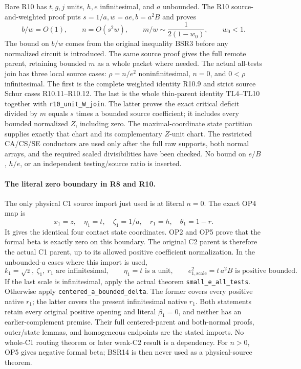 Bare R10 has \(t,g,j\) units, \(h,e\) infinitesimal,
and \(a\) unbounded.  The R10 source-and-weighted proof puts
\(s=1/a,w=ae,b=a^2B\) and proves
\[
 b/w=O(1),\qquad n=O(s^2w),\qquad
 m/w\sim\frac1{2(1-w_0)},\qquad w_0<1 .
 \tag{BSR13}
\]
The bound on \(b/w\) comes from the original inequality
BSR3 before any normalized circuit is introduced.
The same source proof gives the full remote parent,
retaining bounded \(m\) as a whole packet where needed.
The actual all-tests join has three local source cases:
\(\rho=n/e^2\) noninfinitesimal, \(n=0\), and
\(0<\rho\) infinitesimal.
The first is the complete weighted identity R10.9
and strict source Schur cases R10.11--R10.12.
The last is the whole thin-parent identity TL4--TL10
together with \texttt{r10\_unit\_W\_join}.
The latter proves the exact critical deficit divided
by \(m\) equals \(s\) times a bounded source coefficient;
it includes every bounded normalized \(Z\), including zero.
The maximal-coordinate state partition supplies exactly
that chart and its complementary \(Z\)-unit chart.
The restricted CA/CS/SE conductors are used only after
the full raw supports, both normal arrays, and the
required scaled divisibilities have been checked.
No bound on \(e/B\), \(h/e\), or an independent
testing/source ratio is inserted.

\paragraph{The literal zero boundary in R8 and R10.}
The only physical C1 source import just used is
at literal \(n=0\).
The exact OP4 map is
\[
 x_1=z,\quad \eta_1=t,\quad \zeta_1=1/a,\quad
 r_1=h,\quad \theta_1=1-r .
 \tag{BSR14}
\]
It gives the identical four contact state coordinates.
OP2 and OP5 prove that the formal beta is exactly zero
on this boundary.  The original C2 parent is therefore
the actual C1 parent, up to its allowed positive
coefficient normalization.
In the unbounded-\(a\) cases where this import is used,
\[
 k_1=\sqrt z,\ \zeta_1,\ r_1\text{ are infinitesimal},
 \qquad \eta_1=t\text{ is a unit},\qquad
 e_{1,\mathrm{scale}}^2=t\,a^2B
 \text{ is positive bounded}.
 \tag{BSR15}
\]
If the last scale is infinitesimal, apply the actual
theorem \texttt{small\_e\_all\_tests}.
Otherwise apply \texttt{centered\_a\_bounded\_delta}.
The former covers every positive native \(r_1\);
the latter covers the present infinitesimal native \(r_1\).
Both statements retain every original positive opening
and literal \(\beta_1=0\), and neither has an
earlier-complement premise.
Their full centered-parent and both-normal proofs,
outer/state lemmas, and homogeneous endpoints are
the stated imports.  No whole-C1 routing theorem
or later weak-C2 result is a dependency.
For \(n>0\), OP5 gives negative formal beta;
BSR14 is then never used as a physical-source theorem.


